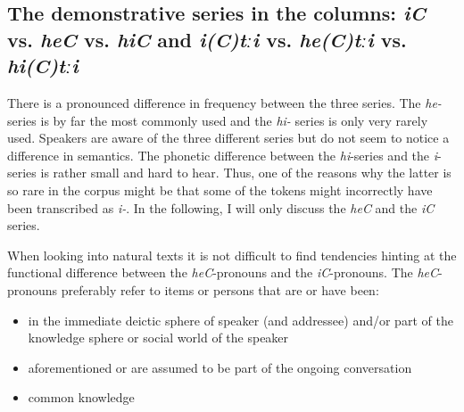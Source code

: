 
\subsection{The demonstrative series in the columns: \textit{iC} vs. \textit{heC} vs. \textit{hiC} and \textit{i(C)tːi} vs. \textit{he(C)tːi} vs. \textit{hi(C)tːi}}
\label{ssec:The vertical dimension: iC vs. heC vs. hiC and i(C)tːi vs. he(C)tːi vs. hi(C)tːi}

There is a pronounced difference in frequency between the three series. The \textit{he-} series is by far the most commonly used and the \textit{hi-} series is only very rarely used. Speakers are aware of the three different series but do not seem to notice a difference in semantics. The phonetic difference between the \textit{hi}-series and the \textit{i}-series is rather small and hard to hear. Thus, one of the reasons why the latter is so rare in the corpus might be that some of the tokens might incorrectly have been transcribed as \textit{i-}. In the following, I will only discuss the \textit{heC} and the \textit{iC} series.

When looking into natural texts it is not difficult to find tendencies hinting at the functional difference between the \textit{heC}-pronouns and the \textit{iC}-pronouns. The \textit{heC}-pronouns preferably refer to items or persons that are or have been:
%
\begin{itemize}
	\item	in the immediate deictic sphere of speaker (and addressee) and/or part of the knowledge sphere or social world of the speaker
	\item	aforementioned or are assumed to be part of the ongoing conversation
	\item	common knowledge
\end{itemize}

